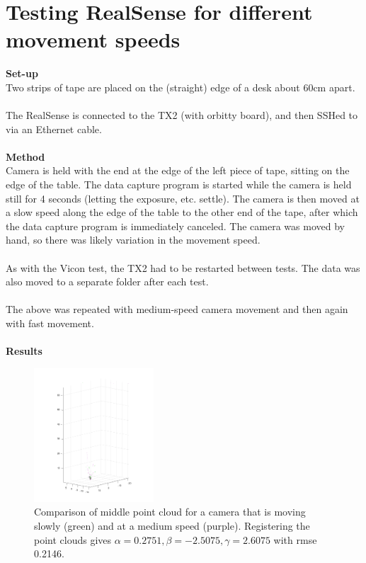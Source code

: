 \documentclass[12pt,a4paper]{article}
\begin{document}
\section{Testing RealSense for different movement speeds}
\textbf{Set-up} \\
Two strips of tape are placed on the (straight) edge of a desk about 60cm apart.
\\\\
The RealSense is connected to the TX2 (with orbitty board), and then SSHed to via an Ethernet cable. 
\\\\
\textbf{Method} \\
Camera is held with the end at the edge of the left piece of tape, sitting on the edge of the table. The data capture program is started while the camera is held still for 4 seconds (letting the exposure, etc. settle). The camera is then moved at a slow speed along the edge of the table to the other end of the tape, after which the data capture program is immediately canceled. The camera was moved by hand, so there was likely variation in the movement speed.
\\\\
As with the Vicon test, the TX2 had to be restarted between tests. The data was also moved to a separate folder after each test.
\\\\
The above was repeated with medium-speed camera movement and then again with fast movement.
\\\\
\textbf{Results} \\
	\begin{figure}[h]
		\centering
		\includegraphics[height=50mm, trim = 20mm 10mm 20mm 140mm, clip]{slow_med.png}
		\caption{Comparison of middle point cloud for a camera that is moving slowly (green) and at a medium speed (purple). Registering the point clouds gives $\alpha = 0.2751, \beta = -2.5075, \gamma = 2.6075$ with rmse 0.2146.}
		\label{f: slow v med}
	\end{figure}
\end{document}
